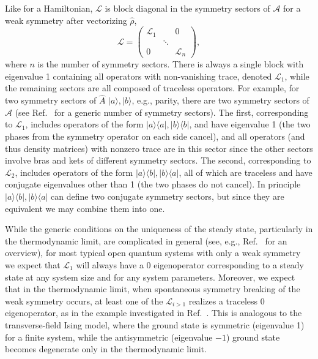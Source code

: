 Like for a Hamiltonian, $\mathcal{L}$ is block diagonal in the symmetry sectors of $\mathcal{A}$ for a weak symmetry after vectorizing $\hat \rho$, 
\begin{equation}
    \mathcal{L} = \left(
    \begin{array}{ccc}
    \mathcal{L}_1 &  & 0 \\
     & \ddots &  \\
    0 &  & \mathcal{L}_{n} 
    \end{array}
    \right),
\end{equation}
where $n$ is the number of symmetry sectors.
There is always a single block with eigenvalue 1 containing all operators with non-vanishing trace, denoted $\mathcal{L}_1$, while the remaining sectors are all composed of traceless operators. For example, for two symmetry sectors of $\hat A$ $|a \rangle, |b \rangle$, e.g., parity, there are two symmetry sectors of $\mathcal{A}$  (see Ref.~\cite{Buca2012} for a generic number of symmetry sectors). The first, corresponding to $\mathcal{L}_1$, includes operators of the form $|a \rangle \langle a|, |b \rangle \langle b|$, and have eigenvalue 1 (the two phases from the symmetry operator on each side cancel), and all operators (and thus density matrices) with nonzero trace are in this sector since the other sectors involve bras and kets of different symmetry sectors. The second, corresponding to $\mathcal{L}_2$, includes operators of the form $|a\rangle \langle b|, |b \rangle \langle a|$, all of which are traceless and have conjugate eigenvalues other than 1 (the two phases do not cancel). In principle $|a\rangle \langle b|, |b \rangle \langle a|$ can define two conjugate symmetry sectors, but since they are equivalent we may combine them into one. 

While the generic conditions on the uniqueness of the steady state, particularly in the thermodynamic limit, are complicated in general (see, e.g., Ref.~\cite{Zhang2024} for an overview), for most typical open quantum systems with only a weak symmetry we expect that $\mathcal{L}_1$ will always have a 0 eigenoperator corresponding to a steady state at any system size and for any system parameters. Moreover, we expect that in the thermodynamic limit, when spontaneous symmetry breaking of the weak symmetry occurs, at least one of the $\mathcal{L}_{i>1}$ realizes a traceless 0 eigenoperator, as in the example investigated in Ref.~\cite{Lieu2020}.
This is analogous to the transverse-field Ising model, where the ground state is symmetric (eigenvalue 1) for a finite system, while the antisymmetric (eigenvalue $-1$) ground state becomes degenerate only in the thermodynamic limit. 

